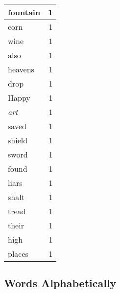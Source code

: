 \begin{center}
\begin{longtable}{l|r}
fountain & 1 \\ \hline
corn & 1 \\ \hline
wine & 1 \\ \hline
also & 1 \\ \hline
heavens & 1 \\ \hline
drop & 1 \\ \hline
Happy & 1 \\ \hline
\emph{art} & 1 \\ \hline
saved & 1 \\ \hline
shield & 1 \\ \hline
sword & 1 \\ \hline
found & 1 \\ \hline
liars & 1 \\ \hline
shalt & 1 \\ \hline
tread & 1 \\ \hline
their & 1 \\ \hline
high & 1 \\ \hline
places & 1 \\ \hline
\end{longtable}
\end{center}



\normalsize



\subsection{Words Alphabetically}

